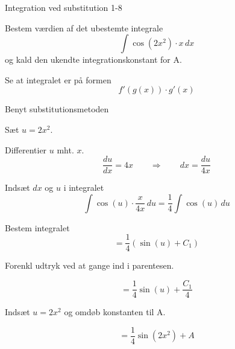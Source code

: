 \documentclass{article}
\begin{document}
\begin{exercise}{Integration ved substitution 1-8}


Bestem værdien af det ubestemte integrale
\[
\int \cos(2x^2) \cdot x \, dx
\]
og kald den ukendte integrationskonstant for A.




\hint

Se at integralet er på formen
\[
f'(g(x)) \cdot g'(x)
\]

\hint

Benyt substitutionsmetoden

\hint

Sæt $u=2x^2$.


\hint

Differentier $u$ mht. $x$.
\[
\frac{du}{dx} = 4x \qquad\Rightarrow \qquad dx = \frac{du}{4x}
\]

\hint

Indsæt $dx$ og $u$ i integralet
\[
\int \cos(u) \cdot \frac{x}{4x} \, du = \frac{1}{4} \int \cos(u) \, du
\]

\hint

Bestem integralet
\[
= \frac{1}{4} \left( \sin(u) + C_1 \right)
\]

\hint
Forenkl udtryk ved at gange ind i parentesen.

\hint

\[
= \frac{1}{4} \sin(u) + \frac{C_1}{4}
\]

\hint

Indsæt $u = 2x^2$ og omdøb konstanten til A.

\hint

\[
= \frac{1}{4} \sin(2x^2) + A
\]


\end{exercise}
\end{document}

